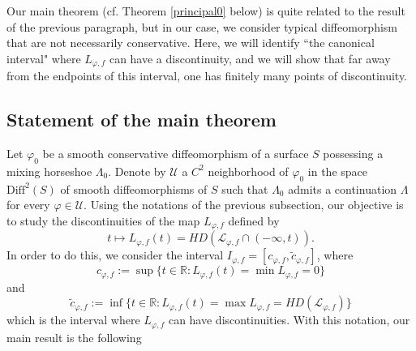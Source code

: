 \documentclass[12pt]{amsart}
\theoremstyle{plain} %
\theoremstyle{definition} %
\numberwithin{equation}{section}
\begin{document}
Our main theorem (cf. Theorem \ref{principal0} below) is quite related to the result of the previous paragraph, but in our case, we consider typical diffeomorphism that are not necessarily conservative. Here, we will identify ``the canonical interval" where $L_{\varphi,f}$ can have a discontinuity, and we will show that far away from the endpoints of this interval, one has finitely many points of discontinuity.

\subsection{Statement of the main theorem}  Let $\varphi_0$ be a smooth conservative diffeomorphism of a surface $S$ possessing a mixing horseshoe $\Lambda_0$. Denote by $\mathcal{U}$ a  $C^{2}$ neighborhood of $\varphi_0$ in the space $\textrm{Diff}^{2}(S)$ of smooth diffeomorphisms of $S$ such that $\Lambda_0$ admits a continuation $\Lambda$ for every $\varphi\in\mathcal{U}$. Using the notations of the previous subsection, our objective is to study the discontinuities of the map $L_{\varphi,f}$ defined by 
$$t\mapsto L_{\varphi,f}(t)=HD(\mathcal{L}_{\varphi, f}\cap (-\infty, t)).$$
In order to do this, we consider the interval $I_{\varphi,f}=[c_{\varphi,f},\tilde{c}_{\varphi,f}]$, where
$$c_{\varphi,f}:=\sup\{t\in\mathbb{R}:L_{\varphi,f}(t)=\min L_{\varphi,f}=0\}$$
and 
$$\tilde{c}_{\varphi,f}:=\inf\{t\in\mathbb{R}:L_{\varphi,f}(t)=\max L_{\varphi,f}=HD(\mathcal{L}_{\varphi,f})\}$$
which is the interval where $L_{\varphi,f}$ can have discontinuities. With this notation, our main result is the following
\end{document}
